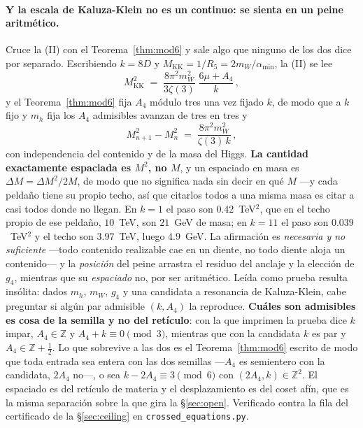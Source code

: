 \documentclass[11pt,a4paper]{article}
\newcommand{\ZZ}{\mathbb{Z}}
\newcommand{\amin}{\alpha_{\min}}
\begin{document}
\paragraph{Y la escala de Kaluza-Klein no es un continuo: se sienta en un peine aritmético.} Cruce
la (II) con el Teorema~\ref{thm:mod6} y sale algo que ninguno de los dos dice por separado.
Escribiendo $k=8D$ y $M_{\mathrm{KK}}=1/R_5=2m_W/\amin$, la (II) se lee
\begin{equation}\label{eq:comb}
  M_{\mathrm{KK}}^{2}\;=\;\frac{8\pi^2m_W^2}{3\zeta(3)}\;\frac{6\mu+A_4}{k}\,,
\end{equation}
y el Teorema~\ref{thm:mod6} fija $A_4$ módulo tres una vez fijado $k$, de modo que a $k$ fijo y
$m_h$ fija los $A_4$ admisibles avanzan de tres en tres y
\begin{equation}\label{eq:comb2}
  M_{n+1}^{2}-M_{n}^{2}\;=\;\frac{8\pi^2m_W^2}{\zeta(3)\,k}\,,
\end{equation}
con independencia del contenido y de la masa del Higgs. \textbf{La cantidad exactamente espaciada
es $M^2$, no $M$}, y un espaciado en masa es $\Delta M=\Delta M^2/2M$, de modo que no significa nada
sin decir en qué $M$ ---y cada peldaño tiene su propio techo, así que citarlos todos a una misma
masa es citar a casi todos donde no llegan. En $k=1$ el paso son $0.42$~TeV$^2$, que en el techo
propio de ese peldaño, $10$~TeV, son $21$~GeV de masa; en $k=11$ el paso son $0.039$~TeV$^2$ y el
techo son $3.97$~TeV, luego $4.9$~GeV. La afirmación es
\emph{necesaria y no suficiente} ---todo contenido realizable cae en un diente, no todo diente
aloja un contenido--- y la \emph{posición} del peine arrastra el residuo del anclaje y la elección de
$g_4$, mientras que su \emph{espaciado} no, por ser aritmético. Leída como prueba resulta insólita:
dados $m_h$, $m_W$, $g_4$ y una candidata a resonancia de Kaluza-Klein, cabe preguntar si algún par
admisible $(k,A_4)$ la reproduce. \textbf{Cuáles son admisibles es cosa de la semilla y no del
retículo}: con la que \cite{KM25} imprimen la prueba dice $k$ impar, $A_4\in\ZZ$ y
$A_4+k\equiv0\pmod3$, mientras que con la candidata $k$ es par y $A_4\in\ZZ+\tfrac12$. Lo que
sobrevive a las dos es el Teorema~\ref{thm:mod6} escrito de modo que toda entrada sea entera con
las dos semillas ---$A_4$ es semientero con la candidata, $2A_4$ no---, o sea
$k-2A_4\equiv3\pmod6$ con $(2A_4,k)\in\ZZ^2$.
El espaciado es del retículo de materia y el desplazamiento es del coset afín, que es la misma
separación sobre la que gira la \S\ref{sec:open}. Verificado contra la fila del
certificado de la \S\ref{sec:ceiling} en \texttt{crossed\_\allowbreak equations.py}.
\end{document}
